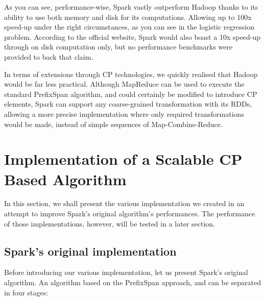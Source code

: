 \documentclass{eplmastersthesis}
\begin{document}
As you can see, performance-wise, Spark vastly outperform Hadoop thanks to its ability to use both memory and disk for its computations. Allowing up to 100x speed-up under the right circumstances, as you can see in the logistic regression problem. According to the official website, Spark would also boast a 10x speed-up through on disk computation only, but no performance benchmarks were provided to back that claim. \newline

In terms of extensions through CP technologies, we quickly realised that Hadoop would be far less practical. Although MapReduce can be used to execute the standard PrefixSpan algorithm, and could certainly be modified to introduce CP elements, Spark can support any coarse-grained transformation with its RDDs, allowing a more precise implementation where only required transformations would be made, instead of simple sequences of Map-Combine-Reduce. \newline

\newpage
\section{Implementation of a Scalable CP Based Algorithm}

In this section, we shall present the various implementation we created in an attempt to improve Spark's original algorithm's performances. The performance of those implementations, however, will be tested in a later section.

\subsection{Spark's original implementation}

Before introducing our various implementation, let us present Spark's original algorithm. An algorithm based on the PrefixSpan approach, and can be separated in four stages:
\end{document}
